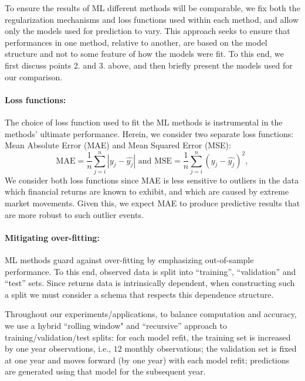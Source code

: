 \documentclass{article}
\begin{document}
To ensure the results of ML different methods will be comparable, we fix both the regularization mechanisms and loss functions used within each method, and allow only the models used for prediction to vary. This approach seeks to ensure that performances in one method, relative to another, are based on the model structure and not to some feature of how the models were fit. To this end, we first discuss points 2. and 3. above, and then briefly present the models used for our comparison. 
\paragraph{Loss functions:}The choice of loss function used to fit the ML methods is instrumental in the methods' ultimate performance. Herein, we consider two separate loss functions: Mean Absolute Error (MAE) and Mean Squared Error (MSE):
\begin{equation*}
\text{MAE} = \frac{1}{n} \sum_{j = i}^{n} |y_j - \hat{y_j}|\text{ and }
\text{MSE} = \frac{1}{n} \sum_{j = i}^{n} \left( y_j - \hat{y_j}\right) ^2,
\end{equation*}We consider both loss functions since MAE is less sensitive to outliers in the data which financial returns are known to exhibit, and which are caused by extreme market movements. Given this, we expect MAE to  produce predictive results that are more robust to such outlier events. 

\paragraph{Mitigating over-fitting:}ML methods guard against over-fitting by emphasizing out-of-sample performance. To this end, observed data is split into ``training”, ``validation'' and ``test'' sets. Since returns data is intrinsically dependent, when constructing such a split we must consider a schema that respects this dependence structure. 

Throughout our experiments/applications, to balance computation and accuracy, we use a  hybrid ``rolling window"  and ``recursive'' approach to training/validation/test splits: for each model refit, the training set is increased by one year observations, i.e., $12$ monthly observations; the validation set is fixed at one year and moves forward (by one year) with each model refit; predictions are generated using that model for the subsequent year.

\end{document}
